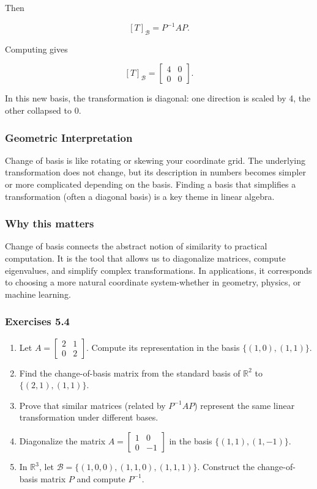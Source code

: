 \documentclass[
  12pt,
  a4paper,
]{article}
\begin{document}
Then

\[[T]_{\mathcal{B}} = P^{-1} A P.\]

Computing gives

\[[T]_{\mathcal{B}} =
\begin{bmatrix}
4 & 0 \\
0 & 0
\end{bmatrix}.\]

In this new basis, the transformation is diagonal: one direction is
scaled by 4, the other collapsed to 0.

\subsubsection{Geometric
Interpretation}\label{geometric-interpretation-11}

Change of basis is like rotating or skewing your coordinate grid. The
underlying transformation does not change, but its description in
numbers becomes simpler or more complicated depending on the basis.
Finding a basis that simplifies a transformation (often a diagonal
basis) is a key theme in linear algebra.

\subsubsection{Why this matters}\label{why-this-matters-19}

Change of basis connects the abstract notion of similarity to practical
computation. It is the tool that allows us to diagonalize matrices,
compute eigenvalues, and simplify complex transformations. In
applications, it corresponds to choosing a more natural coordinate
system-whether in geometry, physics, or machine learning.

\subsubsection{Exercises 5.4}\label{exercises-54}

\begin{enumerate}
\def\labelenumi{\arabic{enumi}.}
\item
  Let \(A = \begin{bmatrix} 2 & 1 \\ 0 & 2 \end{bmatrix}\). Compute its
  representation in the basis \(\{(1,0),(1,1)\}\).
\item
  Find the change-of-basis matrix from the standard basis of
  \(\mathbb{R}^2\) to \(\{(2,1),(1,1)\}\).
\item
  Prove that similar matrices (related by \(P^{-1}AP\)) represent the
  same linear transformation under different bases.
\item
  Diagonalize the matrix
  \(A = \begin{bmatrix} 1 & 0 \\ 0 & -1 \end{bmatrix}\) in the basis
  \(\{(1,1),(1,-1)\}\).
\item
  In \(\mathbb{R}^3\), let
  \(\mathcal{B} = \{(1,0,0),(1,1,0),(1,1,1)\}\). Construct the
  change-of-basis matrix \(P\) and compute \(P^{-1}\).
\end{enumerate}
\end{document}
